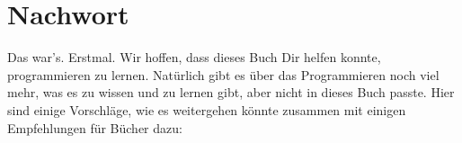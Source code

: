 
\chapter*{Nachwort}
\label{chap:nachwort}

Das war's.  Erstmal.  Wir hoffen, dass dieses Buch Dir helfen konnte,
programmieren zu lernen.  Natürlich gibt es über das Programmieren
noch viel mehr, was es zu wissen und zu lernen gibt, aber nicht in
dieses Buch passte.  Hier sind einige Vorschläge, wie es weitergehen
könnte zusammen mit einigen Empfehlungen für Bücher dazu:
%
